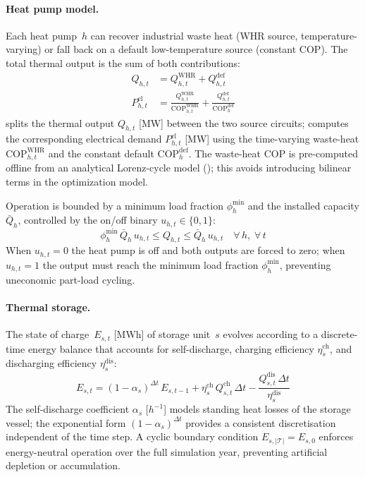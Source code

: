 \documentclass[a4paper,fleqn]{cas-dc}
\begin{document}
\paragraph{Heat pump model.}
Each heat pump~$h$ can recover industrial waste heat (WHR source,
temperature-varying) or fall back on a default low-temperature
source (constant COP). The total thermal output is the sum of both
contributions:
%
\begin{align}
  Q_{h,t} &= Q_{h,t}^{\mathrm{WHR}} + Q_{h,t}^{\mathrm{def}}
  \label{eq:hp_split} \\[4pt]
  P_{h,t}^{\mathrm{el}} &= \frac{Q_{h,t}^{\mathrm{WHR}}}{
    \mathrm{COP}_{h,t}^{\mathrm{WHR}}}
    + \frac{Q_{h,t}^{\mathrm{def}}}{\mathrm{COP}_h^{\mathrm{def}}}
  \label{eq:hp_pel}
\end{align}
%
 splits the thermal output $Q_{h,t}$ [MW]
between the two source circuits;  computes the
corresponding electrical demand $P_{h,t}^{\mathrm{el}}$ [MW] using
the time-varying waste-heat $\mathrm{COP}_{h,t}^{\mathrm{WHR}}$
and the constant default $\mathrm{COP}_h^{\mathrm{def}}$.
The waste-heat COP is pre-computed offline from an analytical
Lorenz-cycle model (); this avoids introducing
bilinear terms in the optimization model.

Operation is bounded by a minimum load fraction
$\phi_h^{\mathrm{min}}$ and the installed capacity $\bar{Q}_h$,
controlled by the on/off binary $u_{h,t} \in \{0,1\}$:
%
\begin{equation}
  \phi_h^{\mathrm{min}}\, \bar{Q}_h\, u_{h,t}
  \leq Q_{h,t} \leq \bar{Q}_h\, u_{h,t}
  \quad \forall\, h,\; \forall\, t
  \label{eq:hp_cap}
\end{equation}
%
When $u_{h,t} = 0$ the heat pump is off and both outputs are
forced to zero; when $u_{h,t} = 1$ the output must reach the
minimum load fraction $\phi_h^{\mathrm{min}}$, preventing
uneconomic part-load cycling.

\paragraph{Thermal storage.}
The state of charge~$E_{s,t}$ [MWh] of storage unit~$s$ evolves
according to a discrete-time energy balance that accounts for
self-discharge, charging efficiency $\eta_s^{\mathrm{ch}}$, and
discharging efficiency $\eta_s^{\mathrm{dis}}$:
%
\begin{equation}
  E_{s,t} = (1 - \alpha_s)^{\Delta t}\, E_{s,t-1}
    + \eta_s^{\mathrm{ch}}\, Q_{s,t}^{\mathrm{ch}}\, \Delta t
    - \frac{Q_{s,t}^{\mathrm{dis}}\, \Delta t}{\eta_s^{\mathrm{dis}}}
  \label{eq:storage_soc}
\end{equation}
%
The self-discharge coefficient $\alpha_s$
[$h^{-1}$] models standing heat losses of the storage vessel;
the exponential form $(1-\alpha_s)^{\Delta t}$ provides a
consistent discretisation independent of the time step. A cyclic
boundary condition $E_{s,|\mathcal{T}|} = E_{s,0}$ enforces
energy-neutral operation over the full simulation year, preventing
artificial depletion or accumulation.
\end{document}
